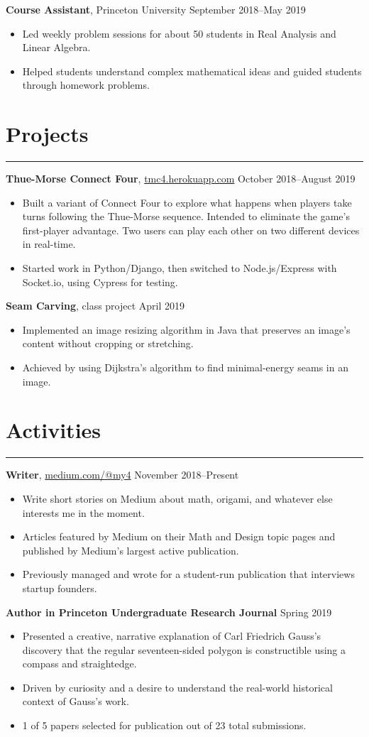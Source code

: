 \documentclass[10pt]{article}
\newcommand{\resumesection}[1]{\vspace{-0.2cm}\section*{#1}\vspace{-0.2cm}\hrule\vspace{0.2cm}}
\begin{document}
\textbf{Course Assistant}, Princeton University \hfill September 2018--May 2019
\begin{itemize}
	\item Led weekly problem sessions for about 50 students in Real Analysis and Linear Algebra.
	\item Helped students understand complex mathematical ideas and guided students through homework problems.
\end{itemize}

\resumesection{Projects}

\textbf{Thue-Morse Connect Four}, \href{https://tmc4.herokuapp.com}{tmc4.herokuapp.com}  \hfill October 2018--August 2019
\begin{itemize}
	\item Built a variant of Connect Four to explore what happens when players take turns following the Thue-Morse sequence. Intended to eliminate the game's first-player advantage. Two users can play each other on two different devices in real-time.
	\item Started work in Python/Django, then switched to Node.js/Express with Socket.io, using Cypress for testing.
\end{itemize}

\textbf{Seam Carving}, class project \hfill April 2019
\begin{itemize}
	\item Implemented an image resizing algorithm in Java that preserves an image's content without cropping or stretching.
	\item Achieved by using Dijkstra's algorithm to find minimal-energy seams in an image.
\end{itemize}

\resumesection{Activities}

\textbf{Writer}, \href{https://medium.com/@my4}{medium.com/@my4} \hfill November 2018--Present
\begin{itemize}
	\item Write short stories on Medium about math, origami, and whatever else interests me in the moment.
	\item Articles featured by Medium on their Math and Design topic pages and published by Medium's largest active publication.
	\item Previously managed and wrote for a student-run publication that interviews startup founders.
\end{itemize}

\textbf{Author in Princeton Undergraduate Research Journal} \hfill Spring 2019
\begin{itemize}
	\item Presented a creative, narrative explanation of Carl Friedrich Gauss's discovery that the regular seventeen-sided polygon is constructible using a compass and straightedge.
	\item Driven by curiosity and a desire to understand the real-world historical context of Gauss's work.
	\item 1 of 5 papers selected for publication out of 23 total submissions.
\end{itemize}
\end{document}
